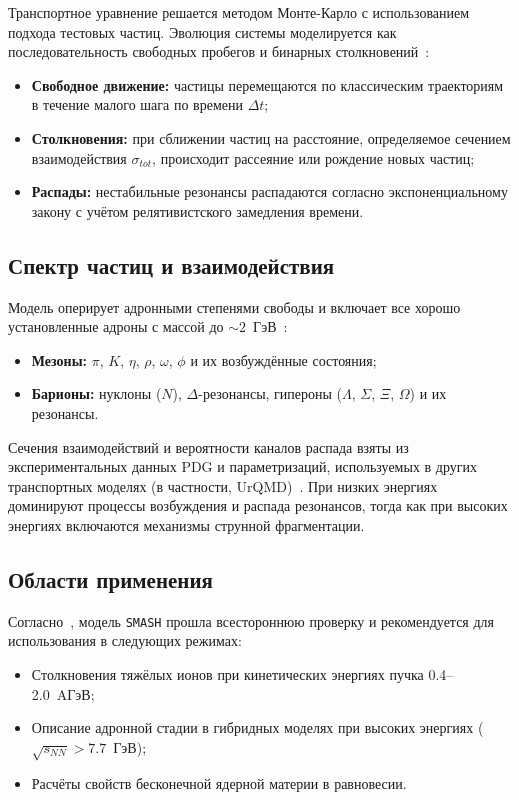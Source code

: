 \documentclass[a4paper]{extarticle}
\begin{document}
        Транспортное уравнение решается методом Монте-Карло 
        с использованием подхода тестовых частиц. 
        Эволюция системы моделируется как последовательность 
        свободных пробегов и бинарных столкновений~\cite{Weil:2016zrk}:
        \begin{itemize}
            \item \textbf{Свободное движение:} 
                частицы перемещаются по классическим траекториям 
                в течение малого шага по времени $\Delta t$;
            \item \textbf{Столкновения:} 
                при сближении частиц на расстояние, 
                определяемое сечением взаимодействия $\sigma_{tot}$, 
                происходит рассеяние или рождение новых частиц;
            \item \textbf{Распады:} 
                нестабильные резонансы распадаются согласно 
                экспоненциальному закону с учётом релятивистского замедления времени.
        \end{itemize}

    \subsection{Спектр частиц и взаимодействия}
        Модель оперирует адронными степенями свободы и включает 
        все хорошо установленные адроны с массой до $\sim 2$~ГэВ~\cite{Weil:2016zrk}:
        \begin{itemize}
            \item \textbf{Мезоны:} 
                $\pi$, $K$, $\eta$, $\rho$, $\omega$, $\phi$ и их возбуждённые состояния;
            \item \textbf{Барионы:} 
                нуклоны ($N$), $\Delta$-резонансы, гипероны ($\Lambda$, $\Sigma$, $\Xi$, $\Omega$) и их резонансы.
        \end{itemize}

        Сечения взаимодействий и вероятности каналов распада взяты из экспериментальных данных PDG 
        и параметризаций, используемых в других транспортных моделях (в частности, UrQMD)~\cite{Weil:2016zrk}. 
        При низких энергиях доминируют процессы возбуждения и распада резонансов, 
        тогда как при высоких энергиях включаются механизмы струнной фрагментации.

    \subsection{Области применения}
        Согласно~\cite{Weil:2016zrk}, модель \texttt{SMASH} 
        прошла всестороннюю проверку и рекомендуется для использования в следующих режимах:
        \begin{itemize}
            \item Столкновения тяжёлых ионов при кинетических энергиях пучка 0.4--2.0~AГэВ;
            \item Описание адронной стадии в гибридных моделях при высоких энергиях ($\sqrt{s_{NN}} > 7.7$~ГэВ);
            \item Расчёты свойств бесконечной ядерной материи в равновесии.
        \end{itemize}
\end{document}
